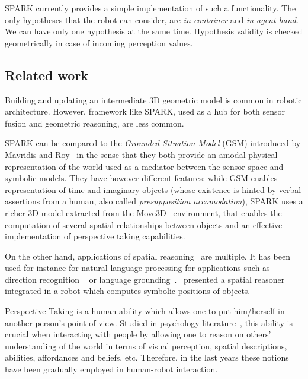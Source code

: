\documentclass{svmult}
\begin{document}
SPARK currently provides a simple implementation of such a functionality. The
only hypotheses that the robot can consider, are \emph{in container} and
\emph{in agent hand}. We can have only one hypothesis at the same time.
Hypothesis validity is checked geometrically in case of incoming perception
values.

\subsection{Related work}

Building and updating an intermediate 3D geometric model is common in robotic
architecture. However, framework like SPARK, used as a hub for both sensor
fusion and geometric reasoning, are less common.

SPARK can be compared to the \emph{Grounded Situation Model} (GSM) introduced
by Mavridis and Roy~\cite{Mavridis2005} in the sense that they both provide an
amodal physical representation of the world used as a mediator between the
sensor space and symbolic models. They have however different features: while
GSM enables representation of time and imaginary objects (whose existence is
hinted by verbal assertions from a human, also called \emph{presupposition
accomodation}), SPARK uses a richer 3D model extracted from the
Move3D~\cite{Simeon2001} environment, that enables the computation of several
spatial relationships between objects and an effective implementation of
perspective taking capabilities.

On the other hand, applications of spatial reasoning~\cite{O'Keefe1999} are
multiple. It has been used for instance for natural language processing for
applications such as direction recognition ~\cite{Kollar2010,Matuszek2010} or
language grounding~\cite{Tellex2010}.~\cite{Skubic2004} presented a spatial
reasoner integrated in a robot which computes symbolic positions of objects.

Perspective Taking is a human ability which allows one to put him/herself in
another person's point of view. Studied in psychology
literature~\cite{Flavell1992,Tversky1999}, this ability is crucial when
interacting with people by allowing one to reason on others' understanding of
the world in terms of visual perception, spatial descriptions, abilities,
affordances and beliefs, etc.  Therefore, in the last years these notions have
been gradually employed in human-robot interaction.



\end{document}

